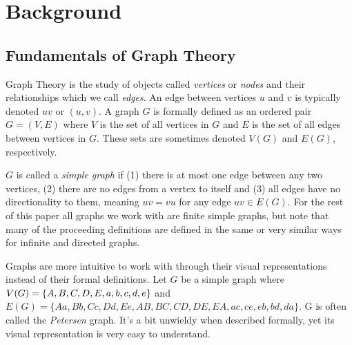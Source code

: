 \chapter{Background}\label{chap:Background}

\section{Fundamentals of Graph Theory}

Graph Theory is the study of objects called \textit{vertices} or \textit{nodes} and their relationships which we call \textit{edges}. An edge between vertices $u$ and $v$ is typically denoted $uv$ or $(u,v)$. A graph $G$ is formally defined as an ordered pair $G = (V,E)$ where $V$ is the set of all vertices in $G$ and $E$ is the set of all edges between vertices in $G$. These sets are sometimes denoted $V(G)$ and $E(G)$, respectively.

$G$ is called a \textit{simple graph} if (1) there is at most one edge between any two vertices, (2) there are no edges from a vertex to itself and (3) all edges have no directionality to them, meaning $uv=vu$ for any edge $uv\in E(G)$. For the rest of this paper all graphs we work with are finite simple graphs, but note that many of the proceeding definitions are defined in the same or very similar ways for infinite and directed graphs.

Graphs are more intuitive to work with through their visual representations instead of their formal definitions. Let $G$ be a simple graph where $V(G)=\{A,B,C,D,E,a,b,c,\newline d, e\}$ and $E(G)=\{Aa,Bb,Cc,Dd,Ee,AB,BC,CD,DE,EA,ac,ce,eb,bd,da\}$. G is often called the \textit{Petersen} graph. It's a bit unwieldy when described formally, yet its visual representation is very easy to understand.

